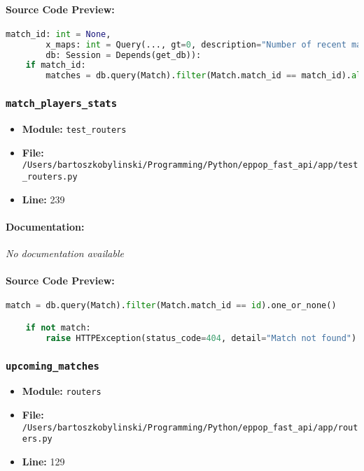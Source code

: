 \documentclass[11pt,a4paper]{article}
\begin{document}
\paragraph{Source Code Preview:}
\begin{lstlisting}[language=Python]
        match_id: int = None,
        x_maps: int = Query(..., gt=0, description="Number of recent maps to consider for statistics"),
        db: Session = Depends(get_db)):
    if match_id:
        matches = db.query(Match).filter(Match.match_id == match_id).all()
\end{lstlisting}

\vspace{1em}
\subsubsection{\texttt{match\_players\_stats}}

\begin{itemize}
    \item \textbf{Module:} \texttt{test\_routers}
    \item \textbf{File:} \texttt{/Users/bartoszkobylinski/Programming/Python/eppop\_fast\_api/app/test\_routers.py}
    \item \textbf{Line:} 239
\end{itemize}

\paragraph{Documentation:} \textit{No documentation available}

\paragraph{Source Code Preview:}
\begin{lstlisting}[language=Python]
    match = db.query(Match).filter(Match.match_id == id).one_or_none()

    if not match:
        raise HTTPException(status_code=404, detail="Match not found")

\end{lstlisting}

\vspace{1em}
\subsubsection{\texttt{upcoming\_matches}}

\begin{itemize}
    \item \textbf{Module:} \texttt{routers}
    \item \textbf{File:} \texttt{/Users/bartoszkobylinski/Programming/Python/eppop\_fast\_api/app/routers.py}
    \item \textbf{Line:} 129
\end{itemize}
\end{document}
